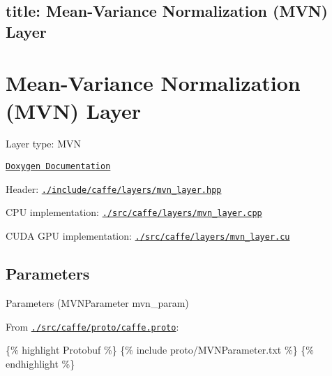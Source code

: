 

 \subsection*{title\+: Mean-\/\+Variance Normalization (M\+VN) Layer }

\section*{Mean-\/\+Variance Normalization (M\+VN) Layer}


\begin{DoxyItemize}
\item Layer type\+: {\ttfamily M\+VN}
\item \href{http://caffe.berkeleyvision.org/doxygen/classcaffe_1_1MVNLayer.html}{\tt Doxygen Documentation}
\item Header\+: \href{https://github.com/BVLC/caffe/blob/master/include/caffe/layers/mvn_layer.hpp}{\tt {\ttfamily ./include/caffe/layers/mvn\+\_\+layer.hpp}}
\item C\+PU implementation\+: \href{https://github.com/BVLC/caffe/blob/master/src/caffe/layers/mvn_layer.cpp}{\tt {\ttfamily ./src/caffe/layers/mvn\+\_\+layer.cpp}}
\item C\+U\+DA G\+PU implementation\+: \href{https://github.com/BVLC/caffe/blob/master/src/caffe/layers/mvn_layer.cu}{\tt {\ttfamily ./src/caffe/layers/mvn\+\_\+layer.cu}}
\end{DoxyItemize}

\subsection*{Parameters}


\begin{DoxyItemize}
\item Parameters ({\ttfamily M\+V\+N\+Parameter mvn\+\_\+param})
\item From \href{https://github.com/BVLC/caffe/blob/master/src/caffe/proto/caffe.proto}{\tt {\ttfamily ./src/caffe/proto/caffe.proto}}\+:
\end{DoxyItemize}

\{\% highlight Protobuf \%\} \{\% include proto/\+M\+V\+N\+Parameter.\+txt \%\} \{\% endhighlight \%\} 